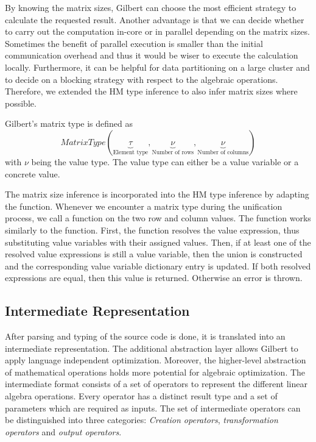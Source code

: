 By knowing the matrix sizes, Gilbert can choose the most efficient strategy to calculate the requested result.
Another advantage is that we can decide whether to carry out the computation in-core or in parallel depending on the matrix sizes.
Sometimes the benefit of parallel execution is smaller than the initial communication overhead and thus it would be wiser to execute the calculation locally.
Furthermore, it can be helpful for data partitioning on a large cluster and to decide on a blocking strategy with respect to the algebraic operations.
Therefore, we extended the HM type inference to also infer matrix sizes where possible.

Gilbert's matrix type is defined as 
\small
\begin{displaymath}
MatrixType(\underbrace{\tau}_{\text{Element type}},\underbrace{\nu}_{\text{Number of rows}},\underbrace{\nu}_{\text{Number of columns}})
\end{displaymath}
\normalsize
with $\nu$ being the value type. The value type can either be a value variable or a concrete value.

The matrix size inference is incorporated into the HM type inference by adapting the  function.
Whenever we encounter a matrix type during the unification process, we call a  function on the two row and column values.
The  function works similarly to the  function.
First, the function resolves the value expression, thus substituting value variables with their assigned values.
Then, if at least one of the resolved value expressions is still a value variable, then the union is constructed and the corresponding value variable dictionary entry is updated.
If both resolved expressions are equal, then this value is returned. 
Otherwise an error is thrown.

\subsection{Intermediate Representation}
\label{sec:intermediaterepresentation}

After parsing and typing of the source code is done, it is translated into an intermediate representation. 
The additional abstraction layer allows Gilbert to apply language independent optimization.
Moreover, the higher-level abstraction of mathematical operations holds more potential for algebraic optimization. 
The intermediate format consists of a set of operators to represent the different linear algebra operations. 
Every operator has a distinct result type and a set of parameters which are required as inputs. 
The set of intermediate operators can be distinguished into three categories: \emph{Creation operators}, \emph{transformation operators} and \emph{output operators}.


